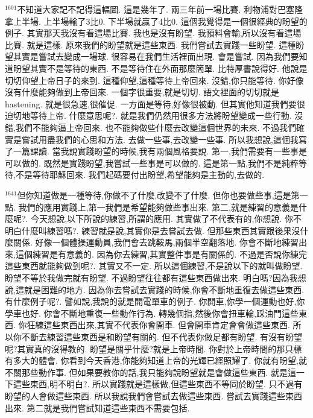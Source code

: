 \documentclass{book}
\begin{document}
$^{1601}$不知道大家記不記得這幅圖.
這是幾年了.
兩三年前一場比賽.
利物浦對巴塞隆拿上半場.
上半場輸了3比0.
下半場就贏了4比0.
這個我覺得是一個很經典的盼望的例子.
其實那天我沒有看這場比賽.
我也是沒有盼望.
我預料會輸,所以沒有看這場比賽.
就是這樣.
原來我們的盼望就是這些東西.
我們嘗試去實踐一些盼望.
這種盼望其實是嘗試去變成一場球.
很容易在我們生活裡面出現.
會是嘗試.
因為我們要知道盼望其實不是等待的東西.
不是等待住在外面那麼簡單.
比特厚書說得好.
他說是切切仰望上帝日子的來到.
這種仰望,這種等待上帝回來.
沒錯,你只能等待.
你好像沒有什麼能夠做到上帝回來.
一個字很重要,就是切切.
語文裡面的切切就是hastening.
就是很急速,很催促.
一方面是等待,好像很被動.
但其實他知道我們要很迫切地等待上帝.
什麼意思呢?.
就是我們仍然用很多方法將盼望變成一些行動.
沒錯,我們不能夠逼上帝回來.
也不能夠做些什麼去改變這個世界的未來.
不過我們確實是嘗試用盡我們的心思和方法.
去做一些事,去改變一些事.
所以我想說,這個我寫了一篇課讀.
當我說實踐盼望的時候,我有兩個風格要說.
第一,我們需要有一些事是可以做的.
既然是實踐盼望,我嘗試一些事是可以做的.
這是第一點,我們不是純粹等待,不是等待耶穌回來.
我們起碼要付出盼望,希望能夠是主動的,去做的.

$^{1641}$但你知道做是一種等待,你做不了什麼,改變不了什麼.
但你也要做些事,這是第一點.
我們的應用實踐上,第一我們是希望能夠做些事出來.
第二,就是練習的意義是什麼呢?.
今天想說,以下所說的練習,所謂的應用.
其實做了不代表有的,你想說.
你不明白什麼叫練習嗎?.
練習就是說,其實你是去嘗試去做.
但那些東西其實跟後果沒什麼關係.
好像一個體操運動員,我們會去跳鞍馬,兩個半空翻落地.
你會不斷地練習出來,這個練習是有意義的.
因為你去練習,其實整件事是有關係的.
不過是否說你練完這些東西就能夠做到呢?.
其實又不一定.
所以這個練習,不是說以下的就叫做盼望.
盼望不等於我做完就有盼望.
不過盼望往往都有這些東西做出來.
明白嗎?因為我想說,這就是困難的地方.
因為你去嘗試去實踐的時候,你會不斷地重復去做這些東西.
有什麼例子呢?.
譬如說,我說的就是開電單車的例子.
你開車,你學一個運動也好,你學車也好.
你會不斷地重復一些動作行為.
轉幾個指,然後你會扭車輪,踩油門這些東西.
你狂練這些東西出來,其實不代表你會開車.
但會開車肯定會會做這些東西.
所以你不斷去練習這些東西是和盼望有關的.
但不代表你做足都有盼望.
有沒有盼望呢?其實真的沒得教的.
盼望是關乎什麼?就是上帝時間.
你對於上帝時間的那只標有多大的體會.
你看到今天香港,你能夠知道上帝的光輝已經照耀了.
你就有盼望,就不關那些動作事.
但如果要教你的話,我只能夠說盼望就是會做這些東西.
就是這一下這些東西,明不明白?.
所以實踐就是這樣做,但這些東西不等同於盼望.
只不過有盼望的人會做這些東西.
所以我說我們會嘗試去做這些東西.
嘗試去實踐這些東西出來.
第二就是我們嘗試知道這些東西不需要包括.
\end{document}
